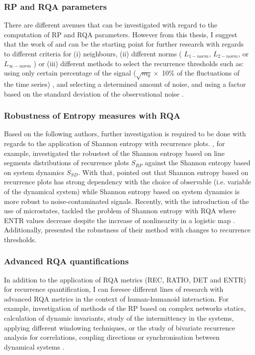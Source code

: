 \subsubsection*{RP and RQA parameters}
There are different avenues that can be investigated 
with regard to the computation of RP and RQA parameters.
However from this thesis, I suggest that the work of 
\cite{marwan2007} and \cite{marwan2015} can be the starting point 
for further research with regards to different criteria for 
(i) neighbours, 
(ii) different norms ( $L_{1-norm}$, $L_{2-norm}$, or $L_{\infty-norm}$ ) or 
(iii) different methods to select the recurrence thresholds such as: 
using only certain percentage of the signal
($\sqrt{m_0} \times$ 10\% of the fluctuations of the time series)
\citep{letellier2006}, and selecting a determined amount of noise, and 
using a factor based on the standard deviation of the 
observational noise \citep{marwan2007}.

\subsubsection*{Robustness of Entropy measures with RQA}
Based on the following authors, further investigation is required 
to be done with regards to the application of Shannon entropy with 
recurrence plots.
\cite{letellier2006} , for example, investigated the robustest of 
the Shannon entropy based on line segments distributions of 
recurrence plots $S_{RP}$ 
against the Shannon entropy based on system dynamics $S_{SD}$.
With that, \cite{letellier2006} pointed out that Shannon entropy based on 
recurrence plots has strong dependency with the choice of observable 
(i.e. variable of the dynamical system) while Shannon entropy based on 
system dynamics is more robust to noise-contaminated signals.
Recently, with the introduction of the use of microstates, 
\cite{corso2017} tackled the problem of Shannon entropy with RQA
where ENTR values decrease despite the increase of nonlinearity 
in a logistic map \citep{marwan2007}. 
Additionally, \cite{corso2017} presented the robustness of their method 
with changes to recurrence thresholds.

\subsubsection*{Advanced RQA quantifications}
In addition to the application of RQA metrics (REC, RATIO, DET and ENTR) for 
recurrence quantification, I can foresee different lines of research 
with advanced RQA metrics in the context of human-humanoid interaction. 
For example, investigation of methods of the RP based on complex 
networks statics, calculation of dynamic invariants, 
study of the intermittency in the systems, 
applying different windowing techniques, or 
the study of bivariate recurrence analysis for correlations, 
coupling directions or synchronisation between dynamical systems
\citep{marwan2007, marwan2015}.

